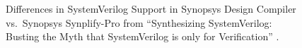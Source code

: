
\begin{figure}[t]
    \centering
    \caption[
        Inconsistencies in SystemVerilog Support in synthesis tools
    ]{
        Differences in SystemVerilog Support in Synopsys Design Compiler vs.\ Synopsys Synplify-Pro from \enquote{Synthesizing SystemVerilog: Busting the Myth that SystemVerilog is only for Verification} \cite{sutherland}.
    }
    \label{fig:dc_vs_synplify}
\end{figure}
